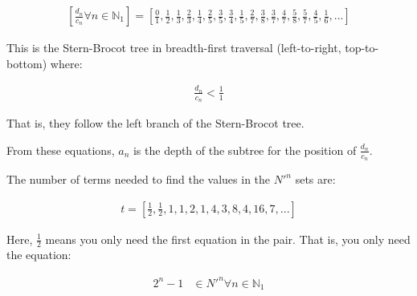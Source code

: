 \documentclass{article}
\begin{document}
\begin{displaymath}\begin{aligned}
\left[
\frac{d_n}{c_n} \forall n \in \mathbb{N}_1
\right]
=
\left[
\frac{0}{1},
\frac{1}{2},
\frac{1}{3},
\frac{2}{3},
\frac{1}{4},
\frac{2}{5},
\frac{3}{5},
\frac{3}{4},
\frac{1}{5},
\frac{2}{7},
\frac{3}{8},
\frac{3}{7},
\frac{4}{7},
\frac{5}{8},
\frac{5}{7},
\frac{4}{5},
\frac{1}{6},
...
\right]
\end{aligned}\end{displaymath}

\noindent
This is the Stern-Brocot tree in breadth-first traversal (left-to-right,
top-to-bottom) where:

\begin{displaymath}\begin{aligned}
\frac{d_n}{c_n} < \frac{1}{1}
\end{aligned}\end{displaymath}

\noindent
That is, they follow the left branch of the Stern-Brocot tree.

\noindent
From these equations, \begin{math}a_n\end{math} is the depth of the subtree
for the position of \begin{math}\frac{d_n}{c_n}\end{math}.

\noindent
The number of terms needed to find the values in the \begin{math}N'^n\end{math}
sets are:

\begin{displaymath}\begin{aligned}
t = \left[ \frac{1}{2}, \frac{1}{2}, 1, 1, 2, 1, 4, 3, 8, 4, 16, 7, ... \right]
\end{aligned}\end{displaymath}

\noindent
Here, \begin{math}\frac{1}{2}\end{math} means you only need the first equation
in the pair. That is, you only need the equation:

\begin{displaymath}\begin{aligned}
2^n-1 & \in N'^n \forall n \in \mathbb{N}_{1}
\end{aligned}\end{displaymath}
\end{document}
